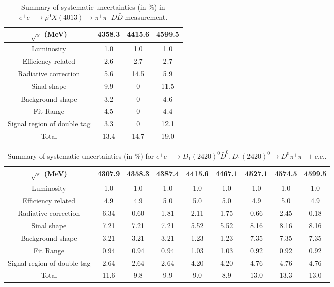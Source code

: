 \documentclass[aps,preprint,superscriptaddress,12pt,tightenlines]{revtex4}
\newcommand{\pp}{\pi^+\pi^-}
\newcommand{\ddb}{D\bar{D}}
\begin{document}
\begin{table}[htbp]
\caption{Summary of systematic uncertainties (in \%) in
$e^{+}e^{-}\to \rho^{0}X(4013)\to \pp\ddb$ measurement.}
\label{sys_err_X4013}
\begin{tabular}{c c c c}
\hline \hline
     $\sqrt{s}$ (MeV)      &4358.3   &4415.6   &4599.5\\
     \hline
    Luminosity                       & 1.0   & 1.0    & 1.0 \\
    Efficiency related               &2.6	 &2.7	  &2.7	\\
    Radiative correction             &5.6    &14.5    &5.9  \\
    Sinal shape                      &9.9    &0       &11.5 \\
    Background shape                 &3.2    &0       &4.6  \\
    Fit Range                        &4.5    &0       &4.4  \\
    Signal region of double tag      &3.3    &0       &12.1  \\
    \hline
    Total                            &13.4  &14.7  &19.0  \\
    \hline
    \hline
\end{tabular}
\end{table}

\begin{table}[htbp]
\caption{Summary of systematic uncertainties (in \%) for
$e^{+}e^{-}\to D_{1}(2420)^{0}\bar{D}^{0}, D_{1}(2420)^{0}\to D^{0}\pi^{+}\pi^{-} +c.c.$.}
\label{sys_err_D0}
\begin{tabular}{c  c  c  c c c c c c}
\hline \hline
   $\sqrt{s}$ (MeV)    &4307.9   &4358.3  &4387.4   &4415.6  &4467.1   &4527.1  &4574.5   &4599.5\\
    \hline
    Luminosity                  & 1.0   & 1.0  & 1.0   & 1.0  & 1.0   & 1.0   & 1.0   & 1.0 \\
    Efficiency related          &4.9	&4.9   &5.0	   &5.0	  &5.0    &4.9	  &5.0	  &4.9 \\
    Radiative correction        &6.34   &0.60  &1.81   &2.11  &1.75   &0.66   &2.45   &0.18   \\
    Sinal shape                 &7.21   &7.21  &7.21   &5.52  &5.52   &8.16   &8.16   &8.16  \\
    Background shape            &3.21   &3.21  &3.21   &1.23  &1.23   &7.35   &7.35   &7.35  \\
    Fit Range                   &0.94   &0.94  &0.94   &1.03  &1.03   &0.92   &0.92   &0.92   \\
    Signal region of double tag &2.64   &2.64  &2.64   &4.20  &4.20   &4.76   &4.76   &4.76  \\
    \hline
    Total                       &11.6  &9.8  &9.9  &9.0  &8.9  &13.0  &13.3  &13.0     \\
    \hline
    \hline
\end{tabular}
\end{table}
\end{document}
